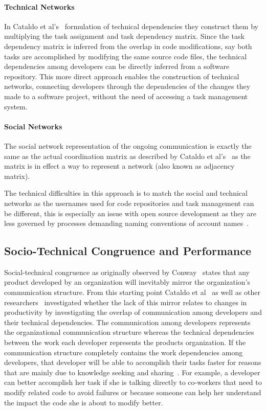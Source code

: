 \paragraph{Technical Networks}
In Cataldo et al's~\cite{cataldo:cscw:2006} formulation of technical dependencies they construct them by multiplying the task assignment and task dependency matrix.
Since the task dependency matrix is inferred from the overlap in code modifications, say both tasks are accomplished by modifying the same source code files, the technical dependencies among developers can be directly inferred from a software repository.
This more direct approach enables the construction of technical networks, connecting developers through the dependencies of the changes they made to a software project, without the need of accessing a task management system.

\paragraph{Social Networks}
The social network representation of the ongoing communication is exactly the same as the actual coordination matrix as described by Cataldo et al's~\cite{cataldo:cscw:2006} as the matrix is in effect a way to represent a network (also known as adjacency matrix).

The technical difficulties in this approach is to match the social and technical networks as the usernames used for code repositories and task management can be different, this is especially an issue with open source development as they are less governed by processes demanding naming conventions of account names~\cite{schroeter:isese:2006}.

\subsection{Socio-Technical Congruence and Performance}
Social-technical congruence as originally observed by Conway~\cite{conway:datamination:1968} states that any product developed by an organization will inevitably mirror the organization's communication structure.
From this starting point Cataldo et al~\cite{cataldo:cscw:2006} as well as other researchers~\cite{valetto:msr:2007,ducheneaut:cscw:2005,ehrlich:stc:2008} investigated whether the lack of this mirror relates to changes in productivity by investigating the overlap of communication among developers and their technical dependencies.
The communication among developers represents the organizational communication structure whereas the technical dependencies between the work each developer represents the products organization.
If the communication structure completely contains the work dependencies among developers, that developer will be able to accomplish their tasks faster for reasons that are mainly due to knowledge seeking and sharing~\cite{desouza2006:knowledge}.
For example, a developer can better accomplish her task if she is talking directly to co-workers that need to modify related code to avoid failures or because someone can help her understand the impact the code she is about to modify better.

